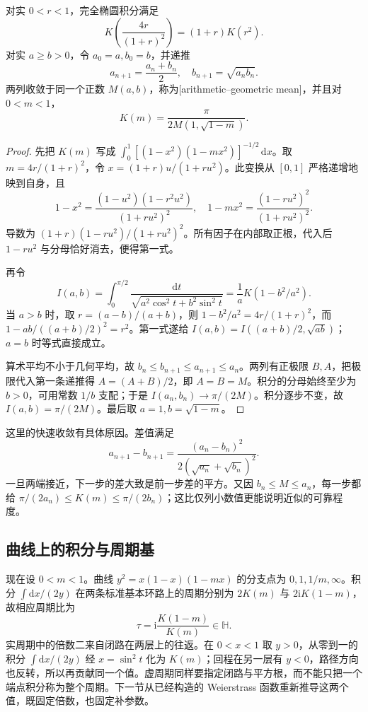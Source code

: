 \begin{proposition}\label{b3:prop:F-landen-agm}
对实 \(0<r<1\)，完全椭圆积分满足
\[
 K\left(\frac{4r}{(1+r)^2}\right)=(1+r)K(r^2).
\]
对实 \(a\ge b>0\)，令 \(a_0=a,b_0=b\)，并递推
\[
 a_{n+1}=\frac{a_n+b_n}{2},\quad b_{n+1}=\sqrt{a_nb_n}.
\]
两列收敛于同一个正数 \(M(a,b)\)，称为[arithmetic--geometric mean]，并且对 \(0<m<1\)，
\[
 K(m)=\frac{\pi}{2M(1,\sqrt{1-m})}.
\]
\end{proposition}
\begin{proof}
先把 \(K(m)\) 写成 \(\int_0^1[(1-x^2)(1-mx^2)]^{-1/2}\,\mathrm{d}x\)。取
\(m=4r/(1+r)^2\)，令 \(x=(1+r)u/(1+ru^2)\)。此变换从 \([0,1]\) 严格递增地映到自身，且
\[
 1-x^2=\frac{(1-u^2)(1-r^2u^2)}{(1+ru^2)^2},
 \quad
 1-mx^2=\frac{(1-ru^2)^2}{(1+ru^2)^2}.
\]
导数为 \((1+r)(1-ru^2)/(1+ru^2)^2\)。所有因子在内部取正根，代入后 \(1-ru^2\) 与分母恰好消去，便得第一式。

再令
\[
 I(a,b)=\int_0^{\pi/2}\frac{\mathrm{d}t}{\sqrt{a^2\cos^2t+b^2\sin^2t}}
       =\frac1a K(1-b^2/a^2).
\]
当 \(a>b\) 时，取 \(r=(a-b)/(a+b)\)，则
\(1-b^2/a^2=4r/(1+r)^2\)，而
\(1-ab/((a+b)/2)^2=r^2\)。第一式遂给
\(I(a,b)=I((a+b)/2,\sqrt{ab})\)；\(a=b\) 时等式直接成立。

算术平均不小于几何平均，故
\(b_n\le b_{n+1}\le a_{n+1}\le a_n\)。两列有正极限 \(B,A\)，把极限代入第一条递推得 \(A=(A+B)/2\)，即 \(A=B=M\)。积分的分母始终至少为 \(b>0\)，可用常数 \(1/b\) 支配；于是 \(I(a_n,b_n)\to\pi/(2M)\)。积分逐步不变，故 \(I(a,b)=\pi/(2M)\)。最后取 \(a=1,b=\sqrt{1-m}\)。
\end{proof}
这里的快速收敛有具体原因。差值满足
\[
 a_{n+1}-b_{n+1}
 =\frac{(a_n-b_n)^2}{2(\sqrt{a_n}+\sqrt{b_n})^2}.
\]
一旦两端接近，下一步的差大致是前一步差的平方。又因 \(b_n\le M\le a_n\)，每一步都给 \(\pi/(2a_n)\le K(m)\le\pi/(2b_n)\)；这比仅列小数值更能说明近似的可靠程度。

\subsection{曲线上的积分与周期基}
\label{b3:subsec:F0405}

现在设 \(0<m<1\)。曲线 \(y^2=x(1-x)(1-mx)\) 的分支点为 \(0,1,1/m,\infty\)。积分 \(\int\mathrm{d}x/(2y)\) 在两条标准基本环路上的周期分别为 \(2K(m)\) 与 \(2\mathrm{i}K(1-m)\)，故相应周期比为
\[
 \tau=\mathrm{i}\frac{K(1-m)}{K(m)}\in\mathbb H.
\]
实周期中的倍数二来自闭路在两层上的往返。在 \(0<x<1\) 取 \(y>0\)，从零到一的积分 \(\int\mathrm{d}x/(2y)\) 经 \(x=\sin^2t\) 化为 \(K(m)\)；回程在另一层有 \(y<0\)，路径方向也反转，所以再贡献同一个值。虚周期同样要指定闭路与平方根，而不能只把一个端点积分称为整个周期。下一节从已经构造的 Weierstrass 函数重新推导这两个值，既固定倍数，也固定补参数。

